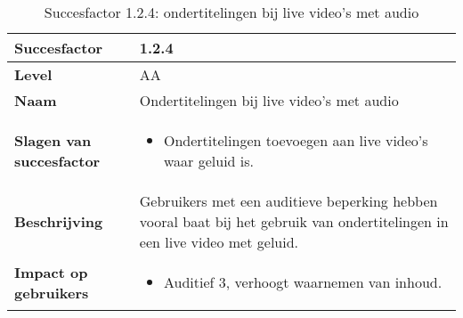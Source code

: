 \begin{table}[H]
    \centering
       \caption{Succesfactor 1.2.4: ondertitelingen bij live video’s met audio}
    \hspace*{-1cm}\begin{tabular}{|l|p{12cm}|} 
        \hline
        \textbf{Succesfactor}                & 1.2.4                                                                                                                                                                                                                                                                                                             \\ 
        \hline
        \textbf{Level}                       & AA                                                                                                                                                                                                                                                                                                                                                                             \\ 
        \hline
        \textbf{Naam}                        & Ondertitelingen bij live video’s met audio~                                                                                                                                                                                                                                                                                                                                                            \\ 
        \hline
        \textbf{Slagen van succesfactor}     & \begin{itemize}
            \item Ondertitelingen toevoegen aan live video’s waar geluid is.
        \end{itemize}                                                                                                                                                                                                      \\ 
        \hline
        \textbf{Beschrijving}                & Gebruikers met een auditieve beperking hebben vooral baat bij het gebruik van ondertitelingen in een live video met geluid.  \\ 
        \hline
        \textbf{Impact op gebruikers}        & 
        \begin{itemize}
            \item Auditief 3, verhoogt waarnemen van inhoud.             

\end{itemize}
\end{tabular}
\end{table}
